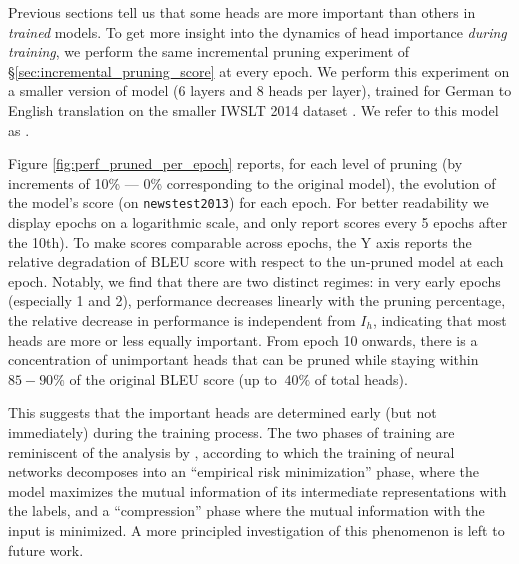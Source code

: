 Previous sections tell us that some heads are more important than others in \emph{trained} models. To get more insight into the dynamics of head importance \emph{during training}, we perform the same incremental pruning experiment of \S\ref{sec:incremental_pruning_score} at every epoch. We perform this experiment on a smaller version of \tfwmt{} model (6 layers and 8 heads per layer), trained for German to English translation on the smaller IWSLT 2014 dataset \cite{Cettolo2015ReportOT}. We refer to this model as \textbf{\tfiwslt{}}.

Figure \ref{fig:perf_pruned_per_epoch} reports, for each level of pruning (by increments of 10\% --- 0\% corresponding to the original model), the evolution of the model's score (on \texttt{newstest2013}) for each epoch. For better readability we display epochs on a logarithmic scale, and only report scores every 5 epochs after the 10th). To make scores comparable across epochs, the Y axis reports the relative degradation of BLEU score with respect to the un-pruned model at each epoch.
Notably, we find that there are two distinct regimes: in very early epochs (especially 1 and 2), performance decreases linearly with the pruning percentage, \ie{} the relative decrease in performance is independent from $I_h$, indicating that most heads are more or less equally important. From epoch 10 onwards, there is a concentration of unimportant heads that can be pruned while staying within $85-90\%$ of the original BLEU score (up to $~40\%$ of total heads). 

This suggests that the important heads are determined early (but not immediately) during the training process. The two
phases of training are reminiscent of the analysis by \citet{ShwartzZiv2017OpeningTB}, according to which the training of neural networks decomposes into an ``empirical risk minimization'' phase, where the model maximizes the mutual information of its intermediate representations with the labels, and a ``compression'' phase where the mutual information with the input is minimized. A more principled investigation of this phenomenon is left to future work.


